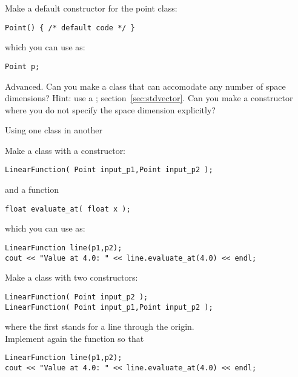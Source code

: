 
\begin{exercise}
  Make a default constructor for the point class:
\begin{verbatim}
Point() { /* default code */ }
\end{verbatim}
  which you can use as:
\begin{verbatim}
Point p;
\end{verbatim}
\end{exercise}

\begin{exercise}
  Advanced. Can you make a  class that can accomodate any
  number of space dimensions? Hint: use a ;
  section~\ref{sec:stdvector}. Can you make a constructor where you do
  not specify the space dimension explicitly?
\end{exercise}

 {Using one class in another}
\label{sec:FuncHasPoint}
\label{sec:poly-rectangle}

\prerequisite{\ref{sec:hasa}}

\begin{exercise}
  \label{ex:geom:line}
  Make a class  with a constructor:
\begin{verbatim}
LinearFunction( Point input_p1,Point input_p2 );
\end{verbatim}
  and a function
\begin{verbatim}
float evaluate_at( float x );
\end{verbatim}
  which you can use as:
\begin{verbatim}
LinearFunction line(p1,p2);
cout << "Value at 4.0: " << line.evaluate_at(4.0) << endl;
\end{verbatim}
\end{exercise}

\begin{exercise}
  \label{ex:geom:line2}
  Make a class  with two constructors:
\begin{verbatim}
LinearFunction( Point input_p2 );
LinearFunction( Point input_p1,Point input_p2 );
\end{verbatim}
where the first stands for a line through the origin.\\
Implement again the  function so that
\begin{verbatim}
LinearFunction line(p1,p2);
cout << "Value at 4.0: " << line.evaluate_at(4.0) << endl;
\end{verbatim}
\end{exercise}

